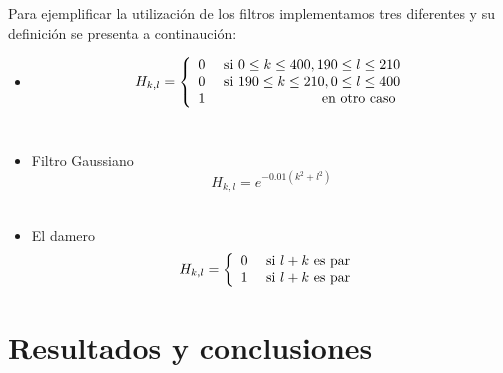 \documentclass{article}
\begin{document}
\begin{multicols}{2}
\par Para ejemplificar la utilización de los filtros implementamos tres diferentes y su definición se presenta a continaución:

\begin{itemize}
    \item \begin{equation} H_{k,l} = \left\{ \begin{array}{lr}
                                0 & \textnormal{ si } 0 \le k \le 400, 190 \le l \le 210\\
                                0 & \textnormal{ si } 190 \le k \le 210, 0 \le l \le 400\\
                                1 & \textnormal { en otro caso }
                               \end{array}
              \right. 
          \end{equation}\\
    \item Filtro Gaussiano \begin{equation} H_{k,l} = e^{ -0.01 (k^2 + l^2)} \end{equation}\\
    \item El damero \begin{equation} H_{k,l} = \left\{ \begin{array}{lr}
                                0 & \textnormal{ si } l + k \textnormal{ es par }\\
                                1 & \textnormal{ si } l + k \textnormal{ es par }
                               \end{array}
              \right. 
          \end{equation}
\end{itemize}

\section{Resultados y conclusiones}
\label{sec4}



\end{multicols}
\end{document}
